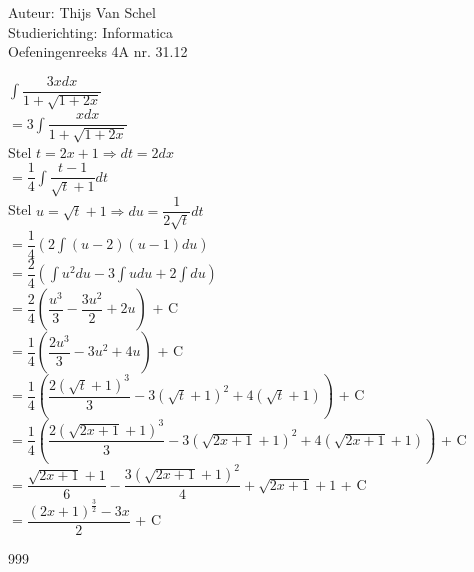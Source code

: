 \documentclass[a4paper]{article}
\newcommand{\dint}{\displaystyle\int}
\begin{document}
  
\noindent \large Auteur: Thijs Van Schel \\
\noindent \large Studierichting: Informatica\\
\noindent \large Oefeningenreeks 4A nr. 31.12\\

\medskip

\normalsize

$\dint \dfrac{3xdx}{1+\sqrt{1+2x}}$\\

$ = 3\dint \dfrac{xdx}{1+\sqrt{1+2x}}$\\

Stel $t = 2x+1\Rightarrow dt = 2dx$\\

$ = \dfrac{1}{4} \dint \dfrac{t-1}{\sqrt{t}+1}dt$\\

Stel $u = \sqrt{t}+1\Rightarrow du = \dfrac{1}{2\sqrt{t}}dt$\\

$ = \dfrac{1}{4} \left( 2\dint (u-2)(u-1)du\right)$\\

$ = \dfrac{2}{4} \left(\dint u^2du - 3\dint u du + 2\dint du\right)$ \\

$ = \dfrac{2}{4} \left( \dfrac{u^3}{3} - \dfrac{3u^2}{2} + 2u \right)$ + C\\

$ = \dfrac{1}{4} \left( \dfrac{2u^3}{3} - 3u^2 + 4u \right)$ + C\\

$ = \dfrac{1}{4} \left( \dfrac{2(\sqrt{t}+1)^3}{3} - 3(\sqrt{t}+1)^2 + 4(\sqrt{t} + 1) \right)$ + C\\

$ = \dfrac{1}{4} \left( \dfrac{2(\sqrt{2x+1}+1)^3}{3} - 3(\sqrt{2x+1}+1)^2 + 4(\sqrt{2x+1}+1) \right)$ + C\\

$ = \dfrac{\sqrt{2x+1}+1}{6} - \dfrac{3(\sqrt{2x+1}+1)^2}{4} + \sqrt{2x+1}+1$ + C\\

$ = \dfrac{(2x+1)^{\tfrac{3}{2}} - 3x}{2}$ + C\\

\begin{thebibliography}{999}
\end{thebibliography}
\end{document}
